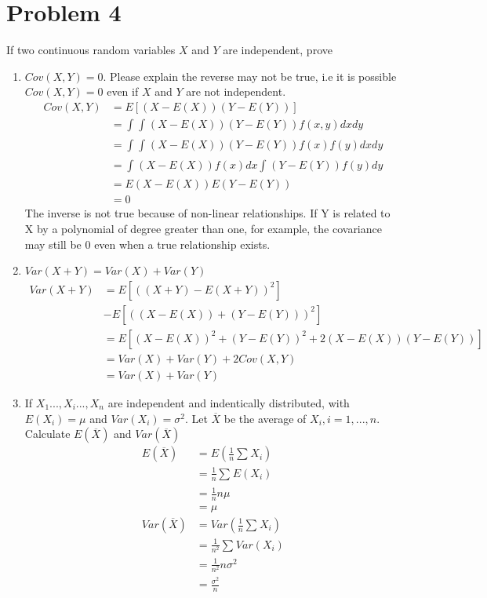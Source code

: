 \documentclass{article}
\begin{document}
    \section{Problem 4}
    If two continuous random variables $X$ and $Y$ are independent, prove
    \begin{enumerate}
        \item $Cov(X,Y) = 0$. Please explain the reverse may not be true, i.e it is possible $Cov(X,Y) = 0$ even if $X$ and $Y$ are not independent.
            \begin{align*}
                Cov(X,Y) &= E[(X-E(X))(Y-E(Y))]\\
                         &= \int_{}^{}\int_{}^{}(X-E(X))(Y-E(Y))f(x,y)dxdy\\
                         &= \int_{}^{}\int_{}^{}(X-E(X))(Y-E(Y))f(x)f(y)dxdy\\
                         &= \int_{}^{}(X-E(X))f(x)dx\int_{}^{}(Y-E(Y))f(y)dy\\
                         &= E(X-E(X))E(Y-E(Y))\\
                         &= 0
            \end{align*}
            The inverse is not true because of non-linear relationships. If Y is related to
            X by a polynomial of degree greater than one, for example, the covariance may still be 0
            even when a true relationship exists.
        \item $Var(X+Y) = Var(X) + Var(Y)$
            \begin{align*}
                Var(X+Y) &= E[((X+Y)-E(X+Y))^2]\\
                         &- E[((X-E(X)) + (Y-E(Y)))^2]\\
                         &= E[(X-E(X))^2 + (Y-E(Y))^2 + 2(X-E(X))(Y-E(Y))]\\
                         &= Var(X) + Var(Y) +2Cov(X,Y)\\
                         &= Var(X) + Var(Y)
            \end{align*}
        \item If $X_1...,X_i...,X_n$ are independent and indentically distributed, with $E(X_i) = \mu $ and $Var(X_i) = \sigma ^2$. Let $\overline{X}$ be the average of $X_i, i=1,...,n$. Calculate $E(\overline{X})$ and $Var(\overline{X})$
            \begin{align*}
                E(\overline{X}) &= E(\frac{1}{n}\sum_{}^{}X_i)\\
                                &=\frac{1}{n} \sum_{}^{}E(X_i)\\
                                &= \frac{1}{n} n\mu \\
                                &= \mu \\
                Var(\overline{X}) &= Var(\frac{1}{n}\sum_{}^{}X_i)\\
                                  &= \frac{1}{n^2}\sum_{}^{}Var(X_i) \\
                                  &= \frac{1}{n^2} n \sigma ^2  \\
                                  &= \frac{\sigma ^2}{n}
            \end{align*}
    \end{enumerate}
\end{document}
